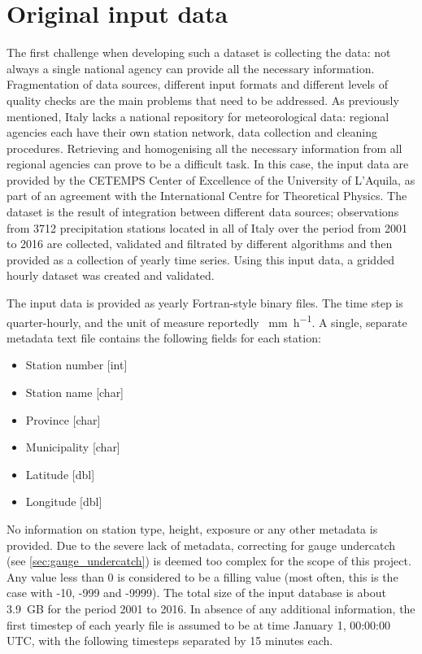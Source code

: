 \section{Original input data} \label{sec:original_input_data}
The first challenge when developing such a dataset is collecting the data: not always a single national agency can provide all the necessary information. Fragmentation of data sources, different input formats and different levels of quality checks are the main problems that need to be addressed. As previously mentioned, Italy lacks a national repository for meteorological data: regional agencies each have their own station network, data collection and cleaning procedures. Retrieving and homogenising all the necessary information from all regional agencies can prove to be a difficult task.
In this case, the input data are provided by the CETEMPS Center of Excellence of the University of L'Aquila, as part of an agreement with the International Centre for Theoretical Physics.
The dataset is the result of integration between different data sources; observations from 3712 precipitation stations located in all of Italy over the period from 2001 to 2016 are collected, validated and filtrated by different algorithms and then provided as a collection of yearly time series.
Using this input data, a gridded hourly dataset was created and validated.

The input data is provided as yearly Fortran-style binary files. The time step is quarter-hourly, and the unit of measure reportedly \SI{}{\milli\metre\per\hour}. A single, separate metadata text file contains the following fields for each station:
\begin{itemize}
    \item Station number [int]
    \item Station name [char]
    \item Province [char]
    \item Municipality [char]
    \item Latitude [dbl]
    \item Longitude [dbl]
\end{itemize}
No information on station type, height, exposure or any other metadata is provided.
Due to the severe lack of metadata, correcting for gauge undercatch (see \cref{sec:gauge_undercatch}) is deemed too complex for the scope of this project.\\
Any value less than 0 is considered to be a filling value (most often, this is the case with -10, -999 and -9999).
The total size of the input database is about \SI{3.9}{\giga B} for the period 2001 to 2016.
In absence of any additional information, the first timestep of each yearly file is assumed to be at time January 1, 00:00:00 UTC, with the following timesteps separated by 15 minutes each.

